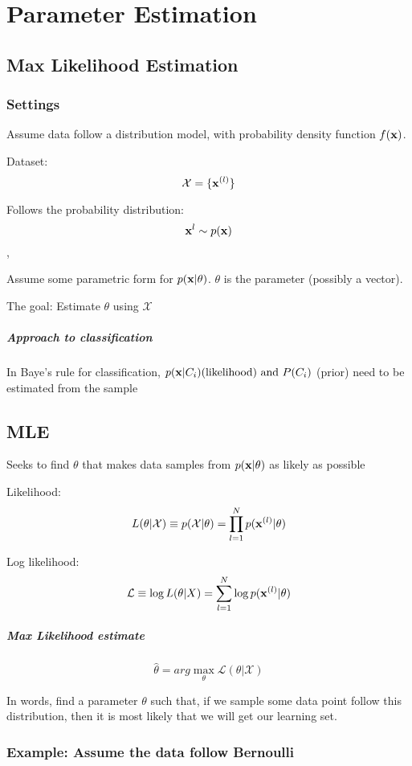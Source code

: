 \chapter{Parameter Estimation}
\section{Max Likelihood Estimation}
\subsection{Settings}
Assume data follow a distribution model, with probability density function
$f(\mathbf{x})$. 

Dataset: \[\mathcal{X}=\{\mathbf{x}^{(l)}\}\]

Follows the probability distribution: \[\mathbf{x}^{l}\sim p(\mathbf{x})\], 

Assume some parametric form for $p(\mathbf{x}|\theta)$. $\theta$ is the parameter
(possibly a vector).

The goal: Estimate $\theta$ using $\mathcal{X}$

\paragraph{Approach to classification} In Baye's rule for classification,
$p(\mathbf{x}|C_i) \mbox{(likelihood) and } P(C_i)$ (prior) need to be estimated from the sample 
\section{MLE}
Seeks to find $\theta$ that makes data samples from $p(\mathbf{x}|\theta)$ as
likely as possible

Likelihood:\[L(\theta|\mathcal{X}) \equiv p(\mathcal{X}|\theta) =
    \prod^N_{l=1}p(\mathbf{x}^{(l)}|\theta)\]

Log likelihood: \[\mathcal{L} \equiv \log L(\theta|X) = \sum^N_{l=1}\log
p(\mathbf{x}^{(l)}|\theta)\]

\paragraph{Max Likelihood estimate} \[\hat{\theta} =
arg\max_{\theta}\mathcal{L}(\theta|\mathcal{X})\]

In words, find a parameter $\theta$ such that, if we sample some data
point follow this distribution, then it is most likely that we will get
our learning set.

\subsection{Example: Assume the data follow Bernoulli}
